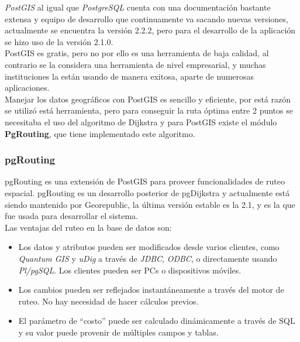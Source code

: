       \emph{PostGIS} al igual que \emph{PostgreSQL} cuenta con una documentaci\'on bastante extensa y equipo de desarrollo que continuamente va sacando nuevas versiones, actualmente se encuentra la versi\'on 2.2.2, pero para el desarrollo de la aplicaci\'on se hizo uso de la versi\'on 2.1.0.\\

      PostGIS es gratis, pero no por ello es una herramienta de baja calidad, al contrario se la considera una herramienta de nivel empresarial, y muchas instituciones la est\'an usando de manera exitosa, aparte de numerosas aplicaciones.\\

      Manejar los datos geográficos con PostGIS es sencillo y eficiente, por está raz\'on se utilizó está herramienta, pero para conseguir la ruta óptima entre 2 puntos se necesitaba el uso del algoritmo de Dijkstra y para PostGIS existe el módulo \textbf{PgRouting}, que tiene implementado este algoritmo.\\

      \subsubsection{pgRouting} %
      \label{sec:pgrouting}
        pgRouting es una extensi\'on  de  PostGIS para proveer funcionalidades de ruteo espacial. pgRouting es un desarrollo posterior de pgDijkstra y actualmente está siendo mantenido por Georepublic, la última versi\'on estable es la 2.1, y es la que fue usada para desarrollar el sistema.\\

        Las ventajas del ruteo en la base de datos son:
        \begin{itemize}
          \item Los datos y atributos pueden ser modificados desde varios clientes, como \emph{Quantum GIS} y \emph{uDig} a través de \emph{JDBC}, \emph{ODBC}, o directamente usando \emph{Pl/pgSQL}. Los clientes pueden ser PCs o dispositivos móviles.
          \item Los cambios pueden ser reflejados instantáneamente a través del motor de ruteo. No hay necesidad de hacer cálculos previos.
          \item El parámetro de ``costo'' puede ser calculado dinámicamente a través de SQL y su valor puede provenir de múltiples campos y tablas.
        \end{itemize}

